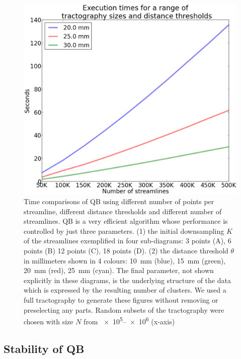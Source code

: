 \documentclass{bioinfo}
\begin{document}
\begin{figure}
\noindent \begin{centering}
\includegraphics[scale=0.23]{Figures/Fig_3_timings}
\par\end{centering}
\caption{Time comparisons of QB using different number of points per
  streamline, different distance thresholds and different number of
  streamlines. QB is a very efficient algorithm whose performance is
  controlled by just three parameters. (1) the initial downsampling $K$
  of the streamlines exemplified in four sub-diagrams: 3 points (A), 6
  points (B) 12 points (C), 18 points (D). (2) the distance threshold
  $\theta$ in millimeters shown in 4 colours: 10~mm (blue), 15~mm
  (green), 20~mm (red), 25~mm (cyan). The final parameter, not shown
  explicitly in these diagrams, is the underlying structure of the data
  which is expressed by the resulting number of clusters.  We used a
  full tractography to generate these figures without removing or
  preselecting any parts. Random subsets of the tractography were chosen
  with size $N$ from \numrange{e5}{e6} (x-axis)\label{Flo:Speed1}}
\end{figure}

\subsection{Stability of QB\label{sub:Comparisons}}
\end{document}
